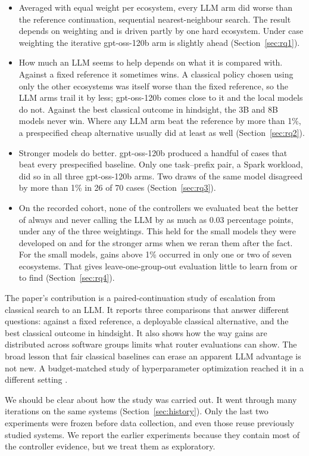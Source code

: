 \begin{itemize}
  \item Averaged with equal weight per ecosystem, every LLM arm did worse than the reference continuation, sequential nearest-neighbour search. The result depends on weighting and is driven partly by one hard ecosystem. Under case weighting the iterative gpt-oss-120b arm is slightly ahead (Section~\ref{sec:rq1}).
  \item How much an LLM seems to help depends on what it is compared with. Against a fixed reference it sometimes wins. A classical policy chosen using only the other ecosystems was itself worse than the fixed reference, so the LLM arms trail it by less; gpt-oss-120b comes close to it and the local models do not. Against the best classical outcome in hindsight, the 3B and 8B models never win. Where any LLM arm beat the reference by more than 1\%, a prespecified cheap alternative usually did at least as well (Section~\ref{sec:rq2}).
  \item Stronger models do better. gpt-oss-120b produced a handful of cases that beat every prespecified baseline. Only one task--prefix pair, a Spark workload, did so in all three gpt-oss-120b arms. Two draws of the same model disagreed by more than 1\% in 26 of 70 cases (Section~\ref{sec:rq3}).
  \item On the recorded cohort, none of the controllers we evaluated beat the better of always and never calling the LLM by as much as 0.03 percentage points, under any of the three weightings. This held for the small models they were developed on and for the stronger arms when we reran them after the fact. For the small models, gains above 1\% occurred in only one or two of seven ecosystems. That gives leave-one-group-out evaluation little to learn from or to find (Section~\ref{sec:rq4}).
\end{itemize}

The paper's contribution is a paired-continuation study of escalation from classical search to an LLM. It reports three comparisons that answer different questions: against a fixed reference, a deployable classical alternative, and the best classical outcome in hindsight. It also shows how the way gains are distributed across software groups limits what router evaluations can show. The broad lesson that fair classical baselines can erase an apparent LLM advantage is not new. A budget-matched study of hyperparameter optimization reached it in a different setting \cite{rodrigues2026worth}.

We should be clear about how the study was carried out. It went through many iterations on the same systems (Section~\ref{sec:history}). Only the last two experiments were frozen before data collection, and even those reuse previously studied systems. We report the earlier experiments because they contain most of the controller evidence, but we treat them as exploratory.

